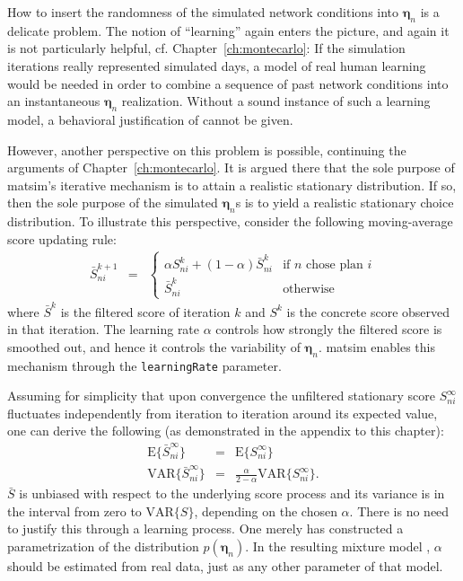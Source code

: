 How to insert the randomness of the simulated network conditions into
$\boldsymbol{\eta}_n$ is a delicate problem. The notion of {}``learning'' again
enters the picture, and again it is not particularly helpful, cf.
Chapter~\ref{ch:montecarlo}: If the simulation iterations really represented
simulated days, a model of real human learning would be needed in
order to combine a sequence of past network conditions into an instantaneous
$\boldsymbol{\eta}_n$ realization. Without a sound instance of such a learning model,
a behavioral justification of  cannot
be given.

However, another perspective on this problem is possible, continuing
the arguments of Chapter~\ref{ch:montecarlo}. It is argued there that
the sole purpose of \gls{matsim}'s iterative mechanism is to attain a realistic
stationary distribution. If so, then the sole purpose of the simulated
$\boldsymbol{\eta}_n$s is to yield a realistic stationary choice distribution. To
illustrate this perspective, consider the following moving-average score
updating rule:
\begin{eqnarray}
\bar{S}_{ni}^{k+1} & = & \begin{cases}
\alpha S_{ni}^{k} + (1 - \alpha)\bar{S}_{ni}^{k} & \text{if }n\text{ chose plan }i\\
\bar{S}_{ni}^{k} & \text{otherwise}
\end{cases}
\end{eqnarray}
where $\bar{S}^{k}$ is the filtered score of iteration $k$ and $S^{k}$
is the concrete score observed in that iteration. The learning rate $\alpha$
controls how strongly the filtered score is smoothed out, and hence
it controls the variability of $\boldsymbol{\eta}_n$. \gls{matsim} enables this mechanism
through the \lstinline{learningRate} parameter.

Assuming for simplicity that upon convergence the unfiltered stationary score
$S_{ni}^{\infty}$ fluctuates independently from iteration to
iteration around its expected value, one can derive the following 
(as demonstrated in the appendix to this chapter):
\begin{eqnarray}
\text{E}\{\bar{S}_{ni}^{\infty}\} & = & \text{E}\{S_{ni}^{\infty}\}\\
\text{VAR}\{\bar{S}_{ni}^{\infty}\} & = & \frac{\alpha}{2-\alpha}\text{VAR}\{S_{ni}^{\infty}\}.
\end{eqnarray}
$\bar{S}$ is unbiased with respect to the underlying score process
and its variance is in the interval from zero to $\text{VAR}\{S\}$,
depending on the chosen $\alpha$. There is no need to justify this
through a learning process. One merely has constructed a parametrization
of the distribution $p(\boldsymbol{\eta}_n)$. In the resulting
mixture model , $\alpha$ should be
estimated from real data, just as any other parameter of that model.



